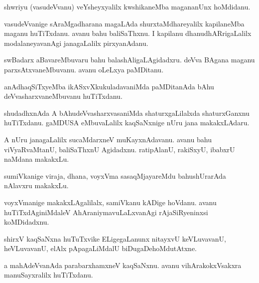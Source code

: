 \documentclass{article}
\begin{document}
\begin{mn}
shwriyu (vasudeVvanu) veYsheyxyalilx kwshikaneMba magananUnx hoMdidanu.
\end{mn}

\begin{mn}
vasudeVvanige sAraMgadharana magaLAda shurxtaMdhareyalilx kapilaneMba
maganu huTiTxdanu. avanu bahu baliSaThxnu. I kapilanu
dhanudhARrigaLalilx modalaneyavanAgi janagaLalilx pirxyanAdanu.
\end{mn}

\begin{mn}%
swBadarx aBavareMbuvaru bahu balashAligaLAgidadxru. deVva BAgana
maganu parxsAtxvaneMbuvanu. avanu oLeLxya paMDitanu.
\end{mn}

\begin{mn}
anAdhaqSiTxyeMba ikASxvXkukuladavaniMda paMDitanAda bAhu
deVvasharxvaneMbuvanu huTiTxdanu.
\end{mn}

\begin{mn}
shudadhxnAda A bAhudeVvasharxvasaniMda shaturxgaLilalxda shaturxGanxnu
huTiTxdanu. gaMDUSA eMbuvaLalilx kaqSaNxnige nUru jana makakxLAdaru.
\end{mn}

\begin{mn}
A nUru janagaLalilx sucaMdarxneV muKayxnAdavanu. avanu bahu
viVyaRvaMtanU, baliSaThxnU Agidadxnu. ratipAlanU, rakiSxyU, ibabxrU
naMdana makakxLu.
\end{mn}

\begin{mn}
sumiVkanige viraja, dhana, voyxVma sasaqMjayareMdu bahushUrarAda
nAlavxru makakxLu.
\end{mn}

\begin{mn}
voyxVmanige makakxLAgalilalx, samiVkanu kADige hoVdanu. avanu
huTiTxdAginiMdaleV AhAraniymavuLaLxvanAgi rAjaSiRyeninxsi koMDidadxnu.
\end{mn}

\begin{mn}%
shirxV kaqSaNxna huTuTxvike ELigegaLanunx nitayxvU keVLuvavanU,
heVLuvavanU, elAlx pApagaLiMdalU biDugaDehoMdutAtxne.
\end{mn}

\begin{mn}
a mahAdeVvanAda parabarxhamxneV kaqSaNxnu. avanu vihArakokxVsakxra
manuSayxralilx huTiTxdanu.
\end{mn}
\end{document}
